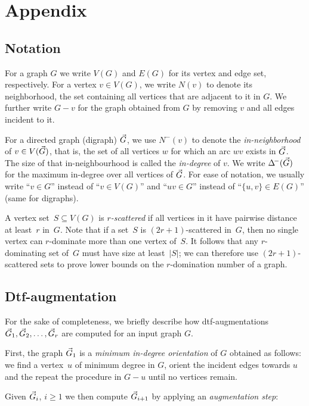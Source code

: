 \appendix

\section{Appendix}

\subsection{Notation}\label{app:notation} For a graph $G$
we write $V(G)$ and $E(G)$ for its vertex and edge set, respectively. For a
vertex $v \in V(G)$, we write $N(v)$ to denote its neighborhood, \ie the set
containing all vertices that are adjacent to it in $G$. We further
write $G-v$ for the graph obtained from $G$ by removing $v$ and all edges
incident to it.

For a directed graph (digraph) $\vec{G}$, we use $N^-(v)$ to denote
the \emph{in-neighborhood} of $v \in V(\vec{G})$, that is, the set
of all vertices $w$ for which an arc $wv$ exists in $\vec{G}$. The
size of that in-neighbourhood is called the \emph{in-degree} of $v$.
We write $\Delta^{\!-}(\vec{G})$ for the maximum in-degree over all
vertices of $\vec{G}$.
For ease of notation, we usually write ``$v \in G$'' instead of
``$v \in V(G)$'' and ``$uv \in G$'' instead of ``$\{u,v\} \in E(G)$''
(same for digraphs).

A vertex set~$S \subseteq V(G)$ is \emph{$r$-scattered} if all vertices
in it have pairwise distance at least~$r$ in~$G$. Note that if a set~$S$
is $(2r+1)$-scattered in~$G$, then no single vertex can $r$-dominate
more than one vertex of~$S$. It follows that any $r$-dominating set of~$G$ must
have size at least~$|S|$; we can therefore use $(2r+1)$-scattered sets to
prove lower bounds on the $r$-domination number of a graph.

\subsection{Dtf-augmentation}\label{app:dtf} For the sake
of completeness, we briefly describe how dtf-augmentations
$\vec{G}_1, \vec{G}_2, \ldots, \vec{G}_r$ are computed for an input
graph $G$.

First, the graph $\vec{G}_1$ is a \emph{minimum in-degree
orientation} of $G$ obtained as follows: we find a vertex~$u$ of
minimum degree in $G$, orient the incident edges towards $u$ and
the repeat the procedure in $G - u$ until no vertices remain.

Given $\vec{G}_i$, $i \geq 1$ we then compute $\vec{G}_{i+1}$ by
applying an \emph{augmentation step}:

